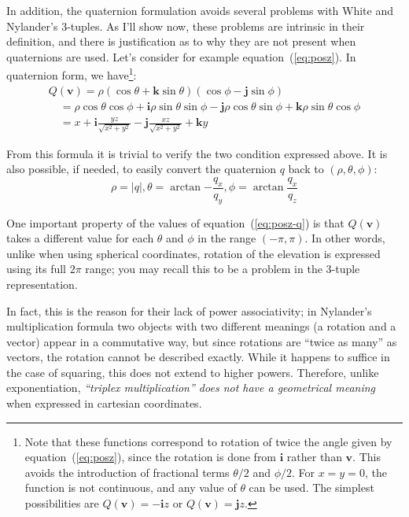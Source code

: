 \documentclass{article}
\let\vec\mathbf
\begin{document}
In addition, the quaternion formulation avoids several problems with
White and Nylander's 3-tuples.  As I'll show now, these problems are
intrinsic in their definition, and there is justification as to why
they are not present when quaternions are used.  Let's consider for
example equation~(\ref{eq:posz}).  In quaternion form, we
have\footnote{Note that these functions correspond to rotation of
  twice the angle given by equation~(\ref{eq:posz}), since the
  rotation is done from $\vec{i}$ rather than $\vec{v}$.  This avoids
  the introduction of fractional terms $\theta/2$ and $\phi/2$.
  For $x=y=0$, the function is not continuous, and any value
  of $\theta$ can be used.  The simplest possibilities are
  $Q(\vec{v}) = -\vec{i}z$ or $Q(\vec{v}) = \vec{j}z$.}:
\begin{equation}
  \label{eq:posz-q}
  \begin{array}{l}
  Q(\vec{v}) = \rho (\cos \theta + \vec{k} \sin \theta) (\cos \phi - \vec{j} \sin \phi)\\
  \quad = \rho \cos \theta \cos \phi + \vec{i} \rho \sin \theta \sin \phi - \vec{j} \rho \cos \theta \sin \phi + \vec{k} \rho \sin \theta \cos \phi\\
  \quad = x + \vec{i}\frac{y z}{\sqrt{x^2 + y^2}} - \vec{j}\frac{x z}{\sqrt{x^2 + y^2}} + \vec{k} y
\end{array}
\end{equation}

\noindent
From this formula it is trivial to verify the two condition expressed
above.  It is also possible, if needed, to easily convert the
quaternion $q$ back to $(\rho, \theta, \phi)$:
\begin{equation*}
  \rho = |q|, \theta = \arctan {-\frac{q_x}{q_y}}, \phi = \arctan \frac{q_x}{q_z}
\end{equation*}

One important property of the values of equation~(\ref{eq:posz-q}) is
that $Q(\vec{v})$ takes a different value for each $\theta$ and $\phi$
in the range $(-\pi, \pi)$.  In other words, unlike when using
spherical coordinates, rotation of the elevation is expressed using
its full $2\pi$ range; you may recall this to be a problem in the
3-tuple representation.

In fact, this is the reason for their lack of power
associativity; in Nylander's multiplication formula two objects with
two different meanings (a rotation and a vector) appear in a
commutative way, but since rotations are ``twice as many'' as vectors,
the rotation cannot be described exactly.  While it happens to suffice
in the case of squaring, this does not extend to higher powers.
Therefore, unlike exponentiation, \emph{``triplex multiplication''
  does not have a geometrical meaning} when expressed in cartesian
coordinates.
\end{document}

